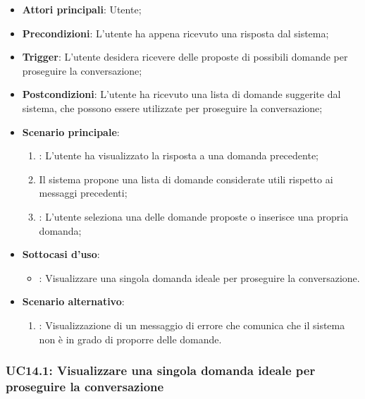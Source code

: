 \begin{itemize}
    \item \textbf{Attori principali}: Utente;
    \item \textbf{Precondizioni}: L'utente ha appena ricevuto una risposta dal sistema;
    \item \textbf{Trigger}: L'utente desidera ricevere delle proposte di possibili domande per proseguire la conversazione;
    \item \textbf{Postcondizioni}: L'utente ha ricevuto una lista di domande suggerite dal sistema, che possono essere utilizzate per proseguire la conversazione;
    \item \textbf{Scenario principale}:
    \begin{enumerate}
        \item {}: L'utente ha visualizzato la risposta a una domanda precedente;
        \item Il sistema propone una lista di domande considerate utili rispetto ai messaggi precedenti;
        \item {}: L'utente seleziona una delle domande proposte o inserisce una propria domanda;
    \end{enumerate}
    \item \textbf{Sottocasi d'uso}:
    \begin{itemize}
        \item {}: Visualizzare una singola domanda ideale per proseguire la conversazione.
    \end{itemize}
    \item \textbf{Scenario alternativo}:
    \begin{enumerate}
        \item {}: Visualizzazione di un messaggio di errore che comunica che il sistema non è in grado di proporre delle domande.
    \end{enumerate}
\end{itemize}

\hypertarget{UC14.1}{}
\subsubsection{UC14.1: Visualizzare una singola domanda ideale per proseguire la conversazione}

